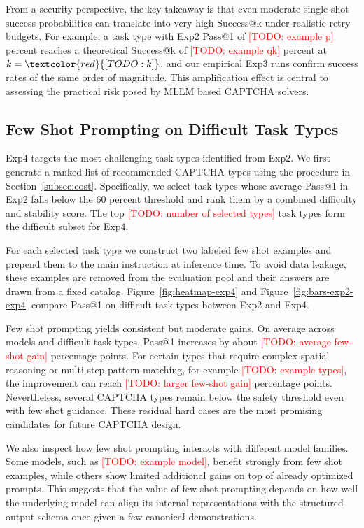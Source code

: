 \documentclass[sigconf, review]{acmart}
\begin{document}
From a security perspective, the key takeaway is that even moderate single shot success probabilities can translate into very high Success@k under realistic retry budgets. For example, a task type with Exp2 Pass@1 of \textcolor{red}{[TODO: example p]} percent reaches a theoretical Success@k of \textcolor{red}{[TODO: example qk]} percent at $k=\textcolor{red}{[TODO: k]}$, and our empirical Exp3 runs confirm success rates of the same order of magnitude. This amplification effect is central to assessing the practical risk posed by MLLM based CAPTCHA solvers.

\subsection{Few Shot Prompting on Difficult Task Types}

Exp4 targets the most challenging task types identified from Exp2. We first generate a ranked list of recommended CAPTCHA types using the procedure in Section~\ref{subsec:cost}. Specifically, we select task types whose average Pass@1 in Exp2 falls below the 60 percent threshold and rank them by a combined difficulty and stability score. The top \textcolor{red}{[TODO: number of selected types]} task types form the difficult subset for Exp4.

For each selected task type we construct two labeled few shot examples and prepend them to the main instruction at inference time. To avoid data leakage, these examples are removed from the evaluation pool and their answers are drawn from a fixed catalog. Figure~\ref{fig:heatmap-exp4} and Figure~\ref{fig:bars-exp2-exp4} compare Pass@1 on difficult task types between Exp2 and Exp4.

Few shot prompting yields consistent but moderate gains. On average across models and difficult task types, Pass@1 increases by about \textcolor{red}{[TODO: average few-shot gain]} percentage points. For certain types that require complex spatial reasoning or multi step pattern matching, for example \textcolor{red}{[TODO: example types]}, the improvement can reach \textcolor{red}{[TODO: larger few-shot gain]} percentage points. Nevertheless, several CAPTCHA types remain below the safety threshold even with few shot guidance. These residual hard cases are the most promising candidates for future CAPTCHA design.

We also inspect how few shot prompting interacts with different model families. Some models, such as \textcolor{red}{[TODO: example model]}, benefit strongly from few shot examples, while others show limited additional gains on top of already optimized prompts. This suggests that the value of few shot prompting depends on how well the underlying model can align its internal representations with the structured output schema once given a few canonical demonstrations.
\end{document}
